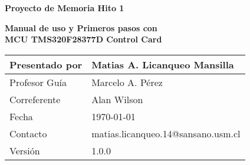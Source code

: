\documentclass[12pt,letterpaper]{article}
\begin{document}
\thispagestyle{empty}
\setcounter{page}{0}
\thispagestyle{empty}


\begin{titlepage}
\vspace*{0.1in}
\vspace*{0.3in}
\begin{center}
\vspace*{-1in}
\begin{figure}[htb]
\begin{center}
    \hspace*{1in}
\end{center}
\end{figure}

\vspace*{1.5in}

\begin{huge}
\textbf{Proyecto de Memoria Hito 1}\\
\end{huge}
\vspace*{0.2in}
\begin{Huge}
\textbf{Manual de uso y Primeros pasos con}\\
\textbf{MCU TMS320F28377D Control Card}
\end{Huge}


\vspace*{2in}
\end{center}



\begin{flushright}
\begin{table}[h!]
\begin{tabular}{|l|l|}
\hline
Presentado por & Matias A. Licanqueo Mansilla \\ \hline
Profesor Guía & Marcelo A. Pérez \\ \hline
Correferente & Alan Wilson \\ \hline
Fecha & \today \\ \hline
Contacto & matias.licanqueo.14@sansano.usm.cl \\ \hline
Versión & 1.0.0 \\ \hline
\end{tabular}
\end{table}
\end{flushright}
\end{titlepage}
\end{document}

